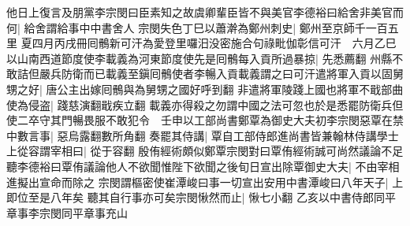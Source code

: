 他日上復言及朋黨李宗閔曰臣素知之故虞卿輩臣皆不與美官李德裕曰給舍非美官而何|{
	給舍謂給事中中書舍人}
宗閔失色丁巳以蕭澣為鄭州刺史|{
	鄭州至京師千一百五里}
夏四月丙戌冊囘鶻新可汗為愛登里囉汨没密施合句祿毗伽彰信可汗　六月乙巳以山南西道節度使李載義為河東節度使先是囘鶻每入貢所過暴掠|{
	先悉薦翻}
州縣不敢詰但嚴兵防衛而已載義至鎭囘鶻使者李暢入貢載義謂之曰可汗遣將軍入貢以固舅甥之好|{
	唐公主出嫁囘鶻與為舅甥之國好呼到翻}
非遣將軍陵踐上國也將軍不戢部曲使為侵盗|{
	踐慈演翻戢疾立翻}
載義亦得殺之勿謂中國之法可忽也於是悉罷防衛兵但使二卒守其門暢畏服不敢犯令　壬申以工部尚書鄭覃為御史大夫初李宗閔惡覃在禁中數言事|{
	惡烏露翻數所角翻}
奏罷其侍講|{
	覃自工部侍郎進尚書皆兼翰林侍講學士}
上從容謂宰相曰|{
	從于容翻}
殷侑經術頗似鄭覃宗閔對曰覃侑經術誠可尚然議論不足聽李德裕曰覃侑議論他人不欲聞惟陛下欲聞之後旬日宣出除覃御史大夫|{
	不由宰相進擬出宣命而除之}
宗閔謂樞密使崔潭峻曰事一切宣出安用中書潭峻曰八年天子|{
	上即位至是八年矣}
聽其自行事亦可矣宗閔愀然而止|{
	愀七小翻}
乙亥以中書侍郎同平章事李宗閔同平章事充山

